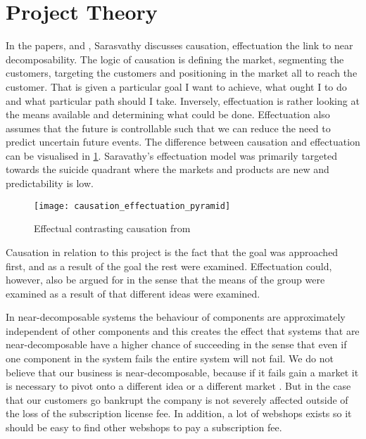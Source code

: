 \section{Project Theory}
In the papers, \citet{Sarasvathy2003203} and \citet{sarasvathy2001causation}, Sarasvathy discusses causation, effectuation the link to near decomposability.
The logic of causation is defining the market, segmenting the customers, targeting the customers and positioning in the market all to reach the customer. 
That is given a particular goal I want to achieve, what ought I to do and what particular path should I take.
Inversely, effectuation is rather looking at the means available and determining what could be done.
Effectuation also assumes that the future is controllable such that we can reduce the need to predict uncertain future events.
The difference between causation and effectuation can be visualised in \cref{fig:causation_effectuation}.
Saravathy's effectuation model was primarily targeted towards the suicide quadrant where the markets and products are new and predictability is low.

\begin{figure}
	\centering
	\texttt{[image: causation\_effectuation\_pyramid]}
	\caption{Effectual contrasting causation from \citet{Sarasvathy2003203}}
	\label{fig:causation_effectuation}
\end{figure}

Causation in relation to this project is the fact that the goal was approached first, and as a result of the goal the rest were examined. 
Effectuation could, however, also be argued for in the sense that the means of the group were examined as a result of that different ideas were examined.
                                                                                                              
In near-decomposable systems the behaviour of components are approximately independent of other components and this creates the effect that systems that are near-decomposable have a higher chance of succeeding in the sense that even if one component in the system fails the entire system will not fail.
We do not believe that our business is near-decomposable, because if it fails gain a market it is necessary to pivot onto a different idea or a different market \citep[pg. 149-178]{ries2011lean}.
But in the case that our customers go bankrupt the company is not severely affected outside of the loss of the subscription license fee. 
In addition, a lot of webshops exists so it should be easy to find other webshops to pay a subscription fee.


